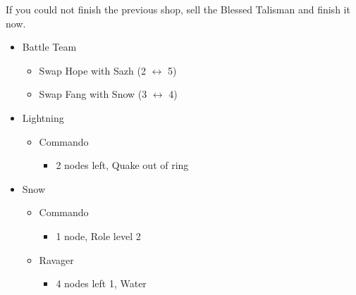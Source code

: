 	If you could not finish the previous shop, sell the Blessed Talisman and finish it now.
	\vfill
	
	\renewcommand{\first}{[1] Strike Team (\com/\syn/\com)}
	\renewcommand{\second}{[2] Tri-Disaster (\rav/\rav/\rav)}
	\renewcommand{\third}{[3] Tri-Disaster (\rav/\rav/\rav)}
	\renewcommand{\fourth}{[4] Cerberus (\com/\com/\com)}
	\renewcommand{\fifth}{[5] Cerberus (\com/\com/\com)}
	\begin{menu}
		\begin{itemize}
			\paradigm
			\begin{itemize}
				\item Battle Team
				      \begin{itemize}
					      \item Swap Hope with Sazh (2 $\leftrightarrow$ 5)
					      \item Swap Fang with Snow (3 $\leftrightarrow$ 4)
				      \end{itemize}
				      {\paradigmline[1]{\textit{\com}}{\textit{\syn}}{\textit{(\com)}}}%
				      {\paradigmline{(\rav)}{\rav}{\rav}}%
				      {\paradigmline{[\rav]}{(\rav)}{(\rav)}}%
				      {\paradigmline{\com}{[\com]}{\com}}%
				      {\paradigmline{\com}{[\com]}{\com}}
			\end{itemize}
			\crystarium
			\begin{itemize}
				\item Lightning
				      \begin{itemize}
					      \item Commando
					            \begin{itemize}
						            \item 2 nodes left, Quake out of ring
					            \end{itemize}
				      \end{itemize}
				\item Snow
				      \begin{itemize}
					      \item Commando
					            \begin{itemize}
						            \item 1 node, Role level 2
					            \end{itemize}
					      \item Ravager
					            \begin{itemize}
						            \item 4 nodes left 1, Water

\end{itemize}
\end{itemize}
\end{itemize}
\end{itemize}
\end{menu}

